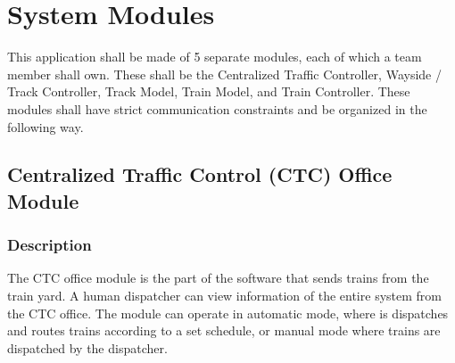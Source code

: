 \documentclass{scrreprt}
\begin{document}



\chapter{System Modules}
This application shall be made of 5 separate modules, each of which a team member shall own.
These shall be the Centralized Traffic Controller, Wayside / Track Controller, Track Model, Train Model, and Train Controller.
These modules shall have strict communication constraints and be organized in the following way.


\section{Centralized Traffic Control (CTC) Office Module}

\subsection{Description}
The CTC office module is the part of the software that sends trains from the
train yard. A human dispatcher can view information of the entire system
from the CTC office. The module can operate in automatic mode, where is dispatches
and routes trains according to a set schedule, or manual mode where trains are
dispatched by the dispatcher.
\end{document}
